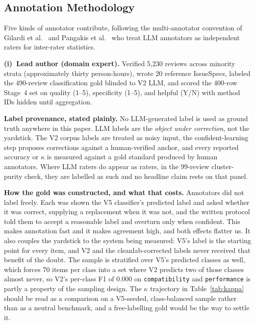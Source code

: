 \documentclass[sigconf, anonymous]{acmart}
\begin{document}
\subsection{Annotation Methodology}
Five kinds of annotator contribute, following the multi-annotator convention of Gilardi et al.~\cite{gilardi2023chatgpt} and Pangakis et al.~\cite{pangakis2023automated} who treat LLM annotators as independent raters for inter-rater statistics.

\textbf{(i)~Lead author (domain expert).} Verified 5{,}230 reviews across minority strata (approximately thirty person-hours), wrote 20 reference IssueSpecs, labeled the 490-review classification gold blinded to V2 LLM, and scored the 400-row Stage~4 set on quality (1--5), specificity (1--5), and helpful (Y/N) with method IDs hidden until aggregation.

\textbf{Label provenance, stated plainly.} No LLM-generated label is used as ground truth
anywhere in this paper. LLM labels are the \emph{object under correction}, not the yardstick.
The V2 corpus labels are treated as noisy input, the confident-learning step proposes
corrections against a human-verified anchor, and every reported accuracy or $\kappa$ is measured
against a gold standard produced by human annotators. Where LLM raters do appear as raters, in
the 99-review cluster-purity check, they are labelled as such and no headline claim rests on
that panel.

\textbf{How the gold was constructed, and what that costs.} Annotators did not label freely.
Each was shown the V5 classifier's predicted label and asked whether it was correct, supplying a
replacement when it was not, and the written protocol told them to accept a reasonable label and
overturn only when confident. This makes annotation fast and it makes agreement high, and both
effects flatter us. It also couples the yardstick to the system being measured: V5's label is the
starting point for every item, and V2 and the cleanlab-corrected labels never received that
benefit of the doubt. The sample is stratified over V5's predicted classes as well, which forces
70 items per class into a set where V2 predicts two of those classes almost never, so V2's
per-class F1 of 0.000 on \texttt{compatibility} and \texttt{performance} is partly a property of
the sampling design. The $\kappa$ trajectory in Table~\ref{tab:kappa} should be read as a
comparison on a V5-seeded, class-balanced sample rather than as a neutral benchmark, and a
free-labelling gold would be the way to settle it.
\end{document}
